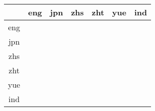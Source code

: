 \documentclass{article}
\begin{document}
\centering
\begin{table}[!h]

\begin{tabular}{|c|c|c|c|c|c|c|}
\hline 

& eng & jpn & zhs & zht & yue & ind \\
\hline 
eng &  &  &  &  &  & \\
\hline 
jpn &  &  &  &  &  & \\
\hline 
zhs &  &  &  &  &  & \\
\hline 
zht &  &  &  &  &  & \\
\hline 
yue &  &  &  &  &  & \\
\hline 
ind &  &  &  &  &  & \\
\hline

\end{tabular}
\end{table}
\end{document}
